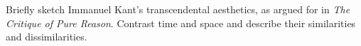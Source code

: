 \needspace{2cm}
\question[5] Briefly sketch Immanuel Kant's transcendental aesthetics, as argued for in \textit{The Critique of Pure Reason}.
Contrast time and space and describe their similarities and dissimilarities.
\vspace{6cm}
